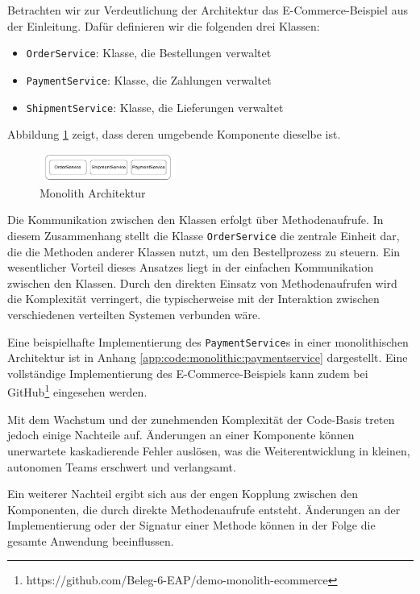 \documentclass[acmtog]{acmart}
\begin{document}
Betrachten wir zur Verdeutlichung der Architektur das E-Commerce-Beispiel aus der Einleitung.
Dafür definieren wir die folgenden drei Klassen:
\begin{itemize}
  \item \texttt{OrderService}: Klasse, die Bestellungen verwaltet
  \item \texttt{PaymentService}: Klasse, die Zahlungen verwaltet
  \item \texttt{ShipmentService}: Klasse, die Lieferungen verwaltet
\end{itemize}
Abbildung \ref{fig:mono} zeigt, dass deren umgebende Komponente dieselbe ist.

\begin{figure}[h!]
  \centering
  \includegraphics[width=0.4\textwidth]{images/mono/mono.pdf}
  \caption{Monolith Architektur}
  \label{fig:mono}
\end{figure}

Die Kommunikation zwischen den Klassen erfolgt über Methodenaufrufe. In diesem
Zusammenhang stellt die Klasse \texttt{OrderService} die zentrale Einheit dar,
die die Methoden anderer Klassen nutzt, um den Bestellprozess zu steuern. Ein
wesentlicher Vorteil dieses Ansatzes liegt in der einfachen Kommunikation
zwischen den Klassen.
Durch den direkten Einsatz von Methodenaufrufen
wird die Komplexität verringert, die typischerweise mit der Interaktion zwischen
verschiedenen verteilten Systemen verbunden wäre.

Eine beispielhafte Implementierung des \texttt{PaymentService}s in einer monolithischen
Architektur ist in Anhang \ref{app:code:monolithic:paymentservice} dargestellt.
Eine vollständige Implementierung des E-Commerce-Beispiels kann zudem bei GitHub\footnote{https://github.com/Beleg-6-EAP/demo-monolith-ecommerce}
eingesehen werden.

Mit dem Wachstum und der zunehmenden Komplexität der Code-Basis treten jedoch
einige Nachteile auf.
Änderungen an einer Komponente können unerwartete kaskadierende
Fehler auslösen, was die Weiterentwicklung in kleinen, autonomen Teams erschwert
und verlangsamt.

Ein weiterer Nachteil ergibt sich aus der engen Kopplung zwischen den Komponenten,
die durch direkte Methodenaufrufe entsteht.
Änderungen an der Implementierung oder
der Signatur einer Methode können in der Folge die gesamte Anwendung beeinflussen.
\end{document}
